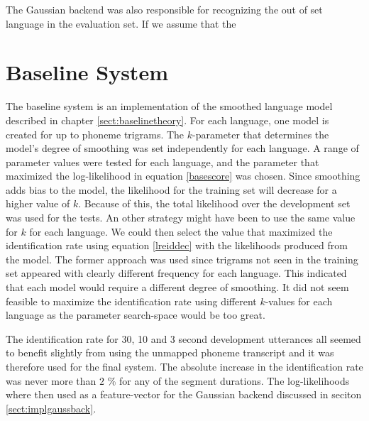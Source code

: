 The Gaussian backend was also responsible for recognizing the out of set language in the evaluation set. If we assume that the 

\section{Baseline System}

The baseline system is an implementation of the smoothed language model described in chapter \ref{sect:baselinetheory}. For each language, one model is created for up to phoneme trigrams. The $k$-parameter that determines the model's degree of smoothing was set independently for each language. A range of parameter values were tested for each language, and the parameter that maximized the log-likelihood in equation \ref{basescore} was chosen. Since smoothing adds bias to the model, the likelihood for the training set will decrease for a higher value of $k$. Because of this, the total likelihood over the development set was used for the tests. An other strategy might have been to use the same value for $k$ for each language. We could then select the value that maximized the identification rate using equation \ref{lreiddec} with the likelihoods produced from the model. The former approach was used since trigrams not seen in the training set appeared with clearly different frequency for each language. This indicated that each model would require a different degree of smoothing. It did not seem feasible to maximize the identification rate using different $k$-values for each language as the parameter search-space would be too great. 

The identification rate for 30, 10 and 3 second development utterances all seemed to benefit slightly from using the unmapped phoneme transcript and it was therefore used for the final system. The absolute increase in the identification rate was never more than $2$ \% for any of the segment durations. The log-likelihoods where then used as a feature-vector for the Gaussian backend discussed in seciton \ref{sect:implgaussback}.